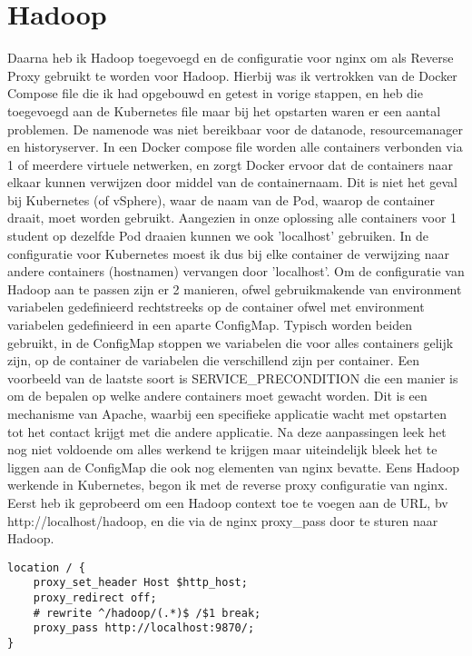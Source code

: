 \section{Hadoop}

Daarna heb ik Hadoop toegevoegd en de configuratie voor nginx om als Reverse Proxy gebruikt te worden voor Hadoop. Hierbij was ik vertrokken van de Docker Compose file die ik had opgebouwd en getest in vorige stappen, en heb die toegevoegd aan de Kubernetes file maar bij het opstarten waren er een aantal problemen. De namenode was niet bereikbaar voor de datanode, resourcemanager en historyserver.
In een Docker compose file worden alle containers verbonden via 1 of meerdere virtuele netwerken, en zorgt Docker ervoor dat de containers naar elkaar kunnen verwijzen door middel van de containernaam. Dit is niet het geval bij Kubernetes (of vSphere), waar de naam van de Pod, waarop de container draait, moet worden gebruikt. Aangezien in onze oplossing alle containers voor 1 student op dezelfde Pod draaien kunnen we ook 'localhost' gebruiken.\newline
In de configuratie voor Kubernetes moest ik dus bij elke container de verwijzing naar andere containers (hostnamen) vervangen door 'localhost'.
\newline
\newline
Om de configuratie van Hadoop aan te passen zijn er 2 manieren, ofwel gebruikmakende van environment variabelen gedefinieerd rechtstreeks op de container ofwel met environment variabelen gedefinieerd in een aparte ConfigMap. Typisch worden beiden gebruikt, in de ConfigMap stoppen we variabelen die voor alles containers gelijk zijn, op de container de variabelen die verschillend zijn per container. Een voorbeeld van de laatste soort is SERVICE\_PRECONDITION die een manier is om de bepalen op welke andere containers moet gewacht worden. Dit is een mechanisme van Apache, waarbij een specifieke applicatie wacht met opstarten tot het contact krijgt met die andere applicatie.
\newline
\newline
Na deze aanpassingen leek het nog niet voldoende om alles werkend te krijgen maar uiteindelijk bleek het te liggen aan de ConfigMap die ook nog elementen van nginx bevatte.
\newline
\newline
Eens Hadoop werkende in Kubernetes, begon ik met de reverse proxy configuratie van nginx. Eerst heb ik geprobeerd om een Hadoop context toe te voegen aan de URL, bv http://localhost/hadoop, en die via de nginx proxy\_pass door te sturen naar Hadoop.
\newline
\newline
\begin{lstlisting}
location / {
    proxy_set_header Host $http_host;
    proxy_redirect off;
    # rewrite ^/hadoop/(.*)$ /$1 break;
    proxy_pass http://localhost:9870/;
}

\end{lstlisting}

